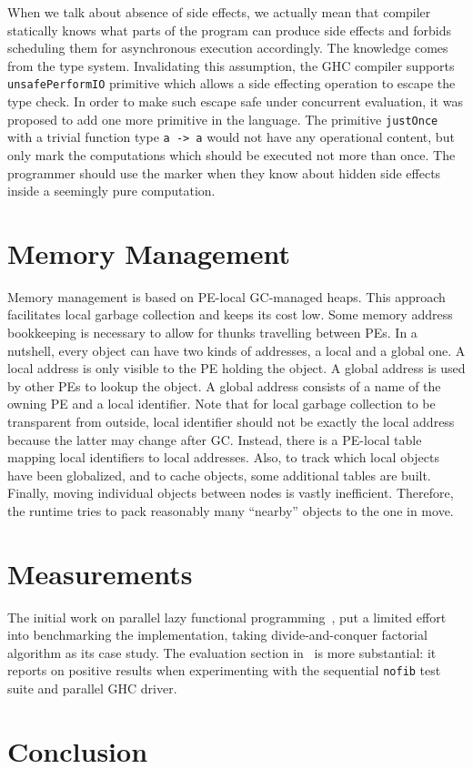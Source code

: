 \documentclass[11pt]{extarticle}
\begin{document}
When we talk about absence of side effects, we actually mean that compiler statically knows what parts of the program can produce side effects and forbids scheduling them for asynchronous execution accordingly. The knowledge comes from the type system. Invalidating this assumption, the GHC compiler supports \texttt{unsafePerformIO} primitive which allows a side effecting operation to escape the type check. In order to make such escape safe under concurrent evaluation, it was proposed to add one more primitive in the language. The primitive \texttt{justOnce} with a trivial function type \texttt{a -> a} would not have any operational content, but only mark the computations which should be executed not more than once. The programmer should use the marker when they know about hidden side effects inside a seemingly pure computation.

\section{Memory Management}

Memory management is based on PE-local GC-managed heaps. This approach facilitates local garbage collection and keeps its cost low. Some memory address bookkeeping is necessary to allow for thunks travelling between PEs. In a nutshell, every object can have two kinds of addresses, a local and a global one. A local address is only visible to the PE holding the object. A global address is used by other PEs to lookup the object. A global address consists of a name of the owning PE and a local identifier. Note that for local garbage collection to be transparent from outside, local identifier should not be exactly the local address because the latter may change after GC. Instead, there is a PE-local table mapping local identifiers to local addresses. Also, to track which local objects have been globalized, and to cache objects, some additional tables are built. Finally, moving individual objects between nodes is vastly inefficient. Therefore, the runtime tries to pack reasonably many ``nearby'' objects to the one in move.

\section{Measurements}

The initial work on parallel lazy functional programming~\cite{Trinder96}, put a limited effort into benchmarking the implementation, taking divide-and-conquer factorial algorithm as its case study. The evaluation section in~\cite{Harris05} is more substantial: it reports on positive results when experimenting with the sequential \texttt{nofib} test suite and parallel GHC driver.

\section{Conclusion}
\end{document}
